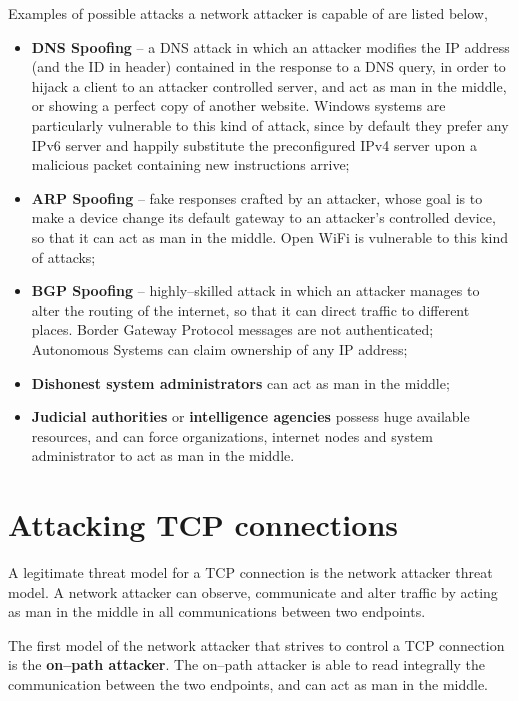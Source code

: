 \documentclass[10pt]{extbook}
\begin{document}
Examples of possible attacks a network attacker is capable of are listed below,
\begin{itemize}
    \item \textbf{DNS Spoofing} -- a DNS attack in which an attacker modifies
        the IP address (and the ID in header) contained in the response to a
        DNS query, in order to hijack a client to an attacker controlled
        server, and act as man in the middle, or showing a perfect copy of
        another website. Windows systems are particularly vulnerable to this
        kind of attack, since by default they prefer any IPv6 server and
        happily substitute the preconfigured IPv4 server upon a malicious
        packet containing new instructions arrive;
    \item \textbf{ARP Spoofing} -- fake responses crafted by an attacker, whose
        goal is to make a device change its default gateway to an attacker's
        controlled device, so that it can act as man in the middle. Open WiFi
        is vulnerable to this kind of attacks;
    \item \textbf{BGP Spoofing} -- highly--skilled attack in which an attacker
        manages to alter the routing of the internet, so that it can direct
        traffic to different places. Border Gateway Protocol messages are not
        authenticated; Autonomous Systems can claim ownership of any IP
        address;
    \item \textbf{Dishonest system administrators} can act as man in the middle;
    \item \textbf{Judicial authorities} or \textbf{intelligence agencies}
        possess huge available resources, and can force organizations, internet
        nodes and system administrator to act as man in the middle.
\end{itemize}


\section{Attacking TCP connections}

A legitimate threat model for a TCP connection is the network attacker threat
model. A network attacker can observe, communicate and alter traffic by acting
as man in the middle in all communications between two endpoints.

The first model of the network attacker that strives to control a TCP connection
is the \textbf{on--path attacker}. The on--path attacker is able to read
integrally the communication between the two endpoints, and can act as man in
the middle.
\end{document}
